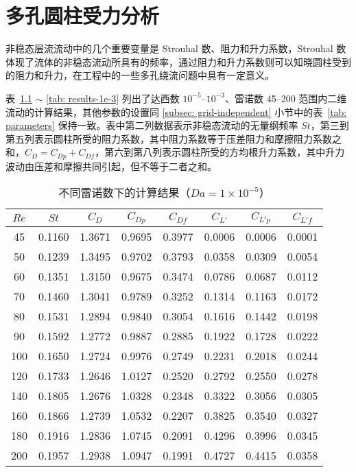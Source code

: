 \chapter{多孔圆柱受力分析}\label{chap: force}

非稳态层流流动中的几个重要变量是 Strouhal 数、阻力和升力系数，Strouhal 数体现了流体的非稳态流动所具有的频率，通过阻力和升力系数则可以知晓圆柱受到的阻力和升力，在工程中的一些多孔绕流问题中具有一定意义。

表~\ref{tab: results-1e-5} $\sim$ \ref{tab: results-1e-3} 列出了达西数 $10^{-5}$--$10^{-3}$、雷诺数 45--200 范围内二维流动的计算结果，其他参数的设置同 \ref{subsec: grid-independent} 小节中的表~\ref{tab: parameters} 保持一致。表中第二列数据表示非稳态流动的无量纲频率 $St$，第三到第五列表示圆柱所受的阻力系数，其中阻力系数等于压差阻力和摩擦阻力系数之和，$C_D=C_{Dp}+C_{Df}$，第六到第八列表示圆柱所受的方均根升力系数，其中升力波动由压差和摩擦共同引起，但不等于二者之和。

\begin{table}[ht]
	\caption{不同雷诺数下的计算结果（$Da=1\times 10^{-5}$）}\label{tab: results-1e-5}
	\vspace{.5em}\centering\wuhao
	\begin{tabular}{*{8}{c}}
		\toprule[1.5pt]
		$Re$ & $St$ & $C_D$ & $C_{Dp}$ & $C_{Df}$ & $C_{L'}$ & $C_{L'p}$ & $C_{L'f}$ \\
		\midrule[1pt]
		45  & 0.1160 & 1.3671 & 0.9695 & 0.3977 & 0.0006 & 0.0006 & 0.0001 \\
		50  & 0.1239 & 1.3495 & 0.9702 & 0.3793 & 0.0358 & 0.0309 &	0.0054 \\
		60  & 0.1351 & 1.3150 & 0.9675 & 0.3474 & 0.0786 & 0.0687 & 0.0112 \\
		70  & 0.1460 & 1.3041 & 0.9789 & 0.3252 & 0.1314 & 0.1163 &	0.0172 \\
		80  & 0.1531 & 1.2894 &	0.9840 & 0.3054 & 0.1616 & 0.1442 &	0.0198 \\
		90  & 0.1592 & 1.2772 &	0.9887 & 0.2885 & 0.1922 & 0.1728 &	0.0222 \\
		100 & 0.1650 & 1.2724 &	0.9976 & 0.2749 & 0.2231 & 0.2018 &	0.0244 \\
		120 & 0.1733 & 1.2646 &	1.0127 & 0.2520 & 0.2792 & 0.2550 &	0.0278 \\
		140 & 0.1805 & 1.2676 &	1.0328 & 0.2348 & 0.3322 & 0.3056 &	0.0305 \\
		160 & 0.1866 & 1.2739 &	1.0532 & 0.2207 & 0.3825 & 0.3540 &	0.0327 \\
		180 & 0.1916 & 1.2836 &	1.0745 & 0.2091 & 0.4296 & 0.3996 &	0.0345 \\
		200 & 0.1957 & 1.2938 &	1.0947 & 0.1991 & 0.4727 & 0.4415 &	0.0358 \\
		\bottomrule[1.5pt]
	\end{tabular}
\end{table}

